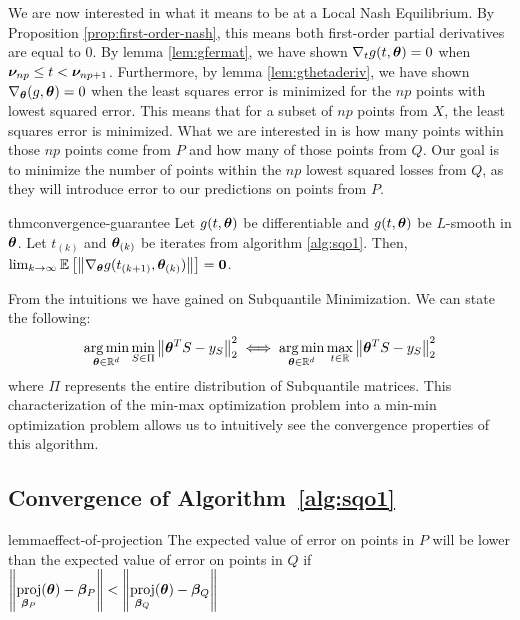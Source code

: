 \documentclass{article} %
\DeclareMathOperator{\proj}{proj}
\newenvironment{proofsketch}{%
	\renewcommand{\proofname}{Proof Sketch}\proof}{\endproof}
\newcommand{\norm}[1]{\left\lVert#1\right\rVert}
\begin{document}
	We are now interested in what it means to be at a Local Nash Equilibrium. By Proposition \ref{prop:first-order-nash}, this means both first-order partial derivatives are equal to $0$. By lemma \ref{lem:gfermat}, we have shown $\nabla_tg(t,{\bm{\theta}}) = 0$ when ${\bm{\nu}}_{np} \leq t < {\bm{\nu}}_{np+1}$. Furthermore, by lemma \ref{lem:gthetaderiv}, we have shown $\nabla_{\bm{\theta}}(g,{\bm{\theta}}) = 0$ when the least squares error is minimized for the $np$ points with lowest squared error.
	This means that for a subset of $np$ points from $X$, the least squares error is minimized. What we are interested in is how many points within those $np$ points come from $P$ and how many of those points from $Q$. Our goal is to minimize the number of points within the $np$ lowest squared losses from $Q$, as they will introduce error to our predictions on points from $P$. 
	
	
	
	\begin{restatable}{thm}{convergence-guarantee}
		\label{thm:convergence-guarantee}
		Let $g(t,{\bm{\theta}})$ be differentiable and $g(t,{\bm{\theta}})$ be $L$-smooth in ${\bm{\theta}}$. Let $t_{(k)}$ and ${\bm{\theta}}_{(k)}$ be iterates from algorithm \ref{alg:sqo1}. Then, $\lim_{k \to \infty} \mathbb{E}\left[\norm{\nabla_\vtheta g(t_{(k+1)},\vtheta_{(k)})}\right] = \vzero$.
	\end{restatable}
	\begin{proofsketch}
		From the intuitions we have gained on Subquantile Minimization. We can state the following:
		\begin{equation}
			\argmin_{\vtheta \in \mathbb{R}^d}\min_{S \in \Pi}\norm{\vtheta^T S - y_S}_2^2 \iff \argmin_{\vtheta \in \mathbb{R}^d}\max_{t \in \mathbb{R}}\norm{\vtheta^T S - y_S}_2^2
		\end{equation}
		where $\Pi$ represents the entire distribution of Subquantile matrices. This characterization of the min-max optimization problem into a min-min optimization problem allows us to intuitively see the convergence properties of this algorithm.
	\end{proofsketch}
	

	\subsection{Convergence of Algorithm~\ref{alg:sqo1}}

	\begin{restatable}{lemma}{effect-of-projection}
		\label{lem:effect-of-projection}
		The expected value of error on points in $P$ will be lower than the expected value of error on points in $Q$ if $\displaystyle \norm{\proj_{\vbeta_P}(\vtheta) - \vbeta_P} < \norm{\proj_{\vbeta_Q}(\vtheta) - \vbeta_Q}$
	\end{restatable}
	
\end{document}
